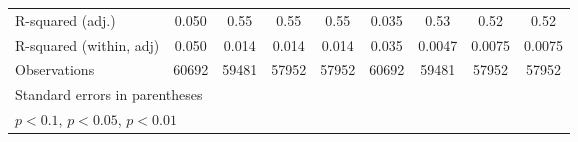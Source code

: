 {\begin{tabular}{l*{8}{c}}
R-squared (adj.)    &       0.050         &        0.55         &        0.55         &        0.55         &       0.035         &        0.53         &        0.52         &        0.52         \\
R-squared (within, adj)&       0.050         &       0.014         &       0.014         &       0.014         &       0.035         &      0.0047         &      0.0075         &      0.0075         \\
Observations        &       60692         &       59481         &       57952         &       57952         &       60692         &       59481         &       57952         &       57952         \\
\bottomrule
\multicolumn{9}{l}{\footnotesize Standard errors in parentheses}\\
\multicolumn{9}{l}{\footnotesize \sym{*} \(p<0.1\), \sym{**} \(p<0.05\), \sym{***} \(p<0.01\)}\\
\end{tabular}
}
